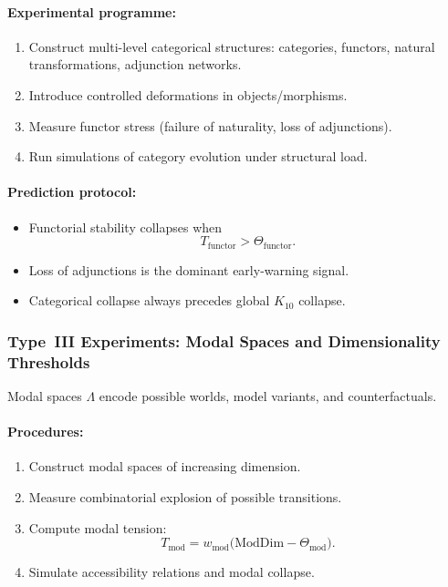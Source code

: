 \paragraph{Experimental programme:}

\begin{enumerate}
    \item Construct multi-level categorical structures:
          categories, functors, natural transformations,
          adjunction networks.
    \item Introduce controlled deformations in objects/morphisms.
    \item Measure functor stress
          (failure of naturality, loss of adjunctions).
    \item Run simulations of category evolution under structural load.
\end{enumerate}

\paragraph{Prediction protocol:}

\begin{itemize}
    \item Functorial stability collapses when
          \[
              T_{\mathrm{functor}} > \Theta_{\mathrm{functor}}.
          \]
    \item Loss of adjunctions is the dominant early-warning signal.
    \item Categorical collapse always precedes global
          $K_{10}$ collapse.
\end{itemize}



\subsubsection{Type~III Experiments: Modal Spaces and Dimensionality Thresholds}

Modal spaces $\Lambda$ encode possible worlds, model variants, and
counterfactuals.

\paragraph{Procedures:}

\begin{enumerate}
    \item Construct modal spaces of increasing dimension.
    \item Measure combinatorial explosion of possible transitions.
    \item Compute modal tension:
          \[
              T_{\mathrm{mod}} =
              w_{\mathrm{mod}}\bigl(
                  \mathrm{ModDim} - \Theta_{\mathrm{mod}}
              \bigr).
          \]
    \item Simulate accessibility relations and modal collapse.
\end{enumerate}

